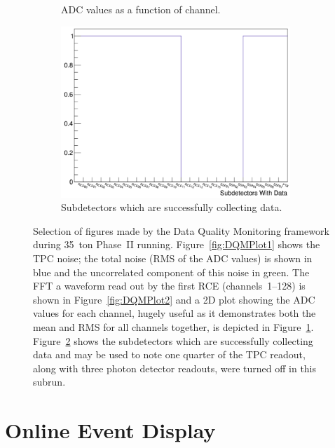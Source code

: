 \begin{figure}
\begin{subfigure}[t]{0.48\linewidth}
    \caption{ADC values as a function of channel.}
    \label{fig:DQMPlot3}
  \end{subfigure}
  \begin{subfigure}[t]{0.48\linewidth}
    \centering
    \includegraphics[width=0.95\textwidth]{DQM4.png}
    \caption{Subdetectors which are successfully collecting data.}
    \label{fig:DQMPlot4}
  \end{subfigure}
  \caption[Selection of figures made by the Data Quality Monitoring framework during 35~ton Phase~II running.]{Selection of figures made by the Data Quality Monitoring framework during 35~ton Phase~II running.  Figure~\ref{fig:DQMPlot1} shows the TPC noise; the total noise (RMS of the ADC values) is shown in blue and the uncorrelated component of this noise in green.  The FFT a waveform read out by the first RCE (channels~1--128) is shown in Figure~\ref{fig:DQMPlot2} and a 2D plot showing the ADC values for each channel, hugely useful as it demonstrates both the mean and RMS for all channels together, is depicted in Figure~\ref{fig:DQMPlot3}.  Figure~\ref{fig:DQMPlot4} shows the subdetectors which are successfully collecting data and may be used to note one quarter of the TPC readout, along with three photon detector readouts, were turned off in this subrun.}
  \label{fig:DQMPlots}
\end{figure}

\section{Online Event Display}\label{sec:EventDisplay}

